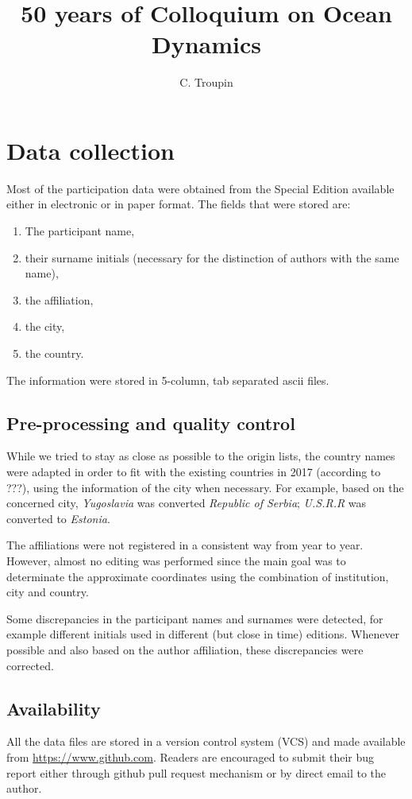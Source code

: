 \documentclass[12pt,a4paper,oneside,final]{article}
\author{C. Troupin}
\title{50 years of Colloquium on Ocean Dynamics}
\begin{document}
\section{Data collection}

Most of the participation data were obtained from the Special Edition available either in electronic or in paper format. The fields that were stored are: 
\begin{enumerate}
\item The participant name,
\item their surname initials (necessary for the distinction of authors with the same name),
\item the affiliation,
\item the city,
\item the country.
\end{enumerate}
The information were stored in 5-column, tab separated ascii files. 

\subsection{Pre-processing and quality control}

While we tried to stay as close as possible to the origin lists, the country names were adapted in order to fit with the existing countries in 2017 (according to ???), using the information of the city when necessary. For example, based on the concerned city, \textit{Yugoslavia} was converted \textit{Republic of Serbia}; \textit{U.S.R.R} was converted to \textit{Estonia}.

The affiliations were not registered in a consistent way from year to year. However, almost no editing was performed since the main goal was to determinate the approximate coordinates using the combination of institution, city and country. 

Some discrepancies in the participant names and surnames were detected, for example different initials used in different (but close in time) editions. Whenever possible and also based on the author affiliation, these discrepancies were corrected.


\subsection{Availability}

All the data files are stored in a version control system (VCS) and made available from \url{https://www.github.com}. Readers are encouraged to submit their bug report either through github pull request mechanism or by direct email to the author. 
\end{document}
